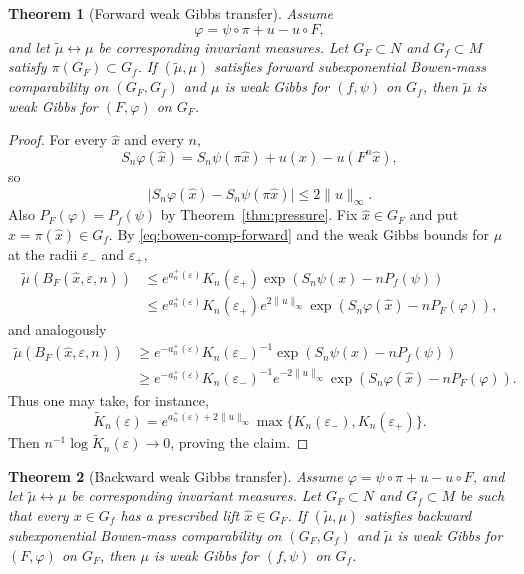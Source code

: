 \documentclass[11pt,a4paper]{article}
\newtheorem{theorem}{Theorem}[section]
\newcommand{\eps}{\varepsilon}
\begin{document}
\begin{theorem}[Forward weak Gibbs transfer]
\label{thm:weak-gibbs-forward}
Assume
\[
\varphi=\psi\circ\pi+u-u\circ F,
\]
and let $\widetilde\mu\leftrightarrow\mu$ be corresponding invariant
measures. Let $G_F\subset N$ and $G_f\subset M$ satisfy
$\pi(G_F)\subset G_f$. If $(\widetilde\mu,\mu)$ satisfies forward
subexponential Bowen-mass comparability on $(G_F,G_f)$ and $\mu$ is weak
Gibbs for $(f,\psi)$ on $G_f$, then $\widetilde\mu$ is weak Gibbs for
$(F,\varphi)$ on $G_F$.
\end{theorem}

\begin{proof}
For every $\hat x$ and every $n$,
\begin{equation}
S_n\varphi(\hat x)
=S_n\psi(\pi\hat x)+u(\hat x)-u(F^n\hat x),
\label{eq:birkhoff-coboundary}
\end{equation}
so
\begin{equation}
\bigl|S_n\varphi(\hat x)-S_n\psi(\pi\hat x)\bigr|
\le2\|u\|_\infty.
\label{eq:birkhoff-bounded-error}
\end{equation}
Also $P_F(\varphi)=P_f(\psi)$ by
Theorem~\ref{thm:pressure}. Fix $\hat x\in G_F$ and put
$x=\pi(\hat x)\in G_f$. By \eqref{eq:bowen-comp-forward} and the weak Gibbs
bounds for $\mu$ at the radii $\eps_-$ and $\eps_+$,
\begin{align*}
\widetilde\mu(B_F(\hat x,\eps,n))
&\le e^{a_n^+(\eps)}K_n(\eps_+)
 \exp(S_n\psi(x)-nP_f(\psi))\\
&\le e^{a_n^+(\eps)}K_n(\eps_+)e^{2\|u\|_\infty}
 \exp(S_n\varphi(\hat x)-nP_F(\varphi)),
\end{align*}
and analogously
\begin{align*}
\widetilde\mu(B_F(\hat x,\eps,n))
&\ge e^{-a_n^+(\eps)}K_n(\eps_-)^{-1}
 \exp(S_n\psi(x)-nP_f(\psi))\\
&\ge e^{-a_n^+(\eps)}K_n(\eps_-)^{-1}e^{-2\|u\|_\infty}
 \exp(S_n\varphi(\hat x)-nP_F(\varphi)).
\end{align*}
Thus one may take, for instance,
\[
\widetilde K_n(\eps)
=e^{a_n^+(\eps)+2\|u\|_\infty}
\max\{K_n(\eps_-),K_n(\eps_+)\}.
\]
Then $n^{-1}\log\widetilde K_n(\eps)\to0$, proving the claim.
\end{proof}

\begin{theorem}[Backward weak Gibbs transfer]
\label{thm:weak-gibbs-backward}
Assume
$\varphi=\psi\circ\pi+u-u\circ F$, and let
$\widetilde\mu\leftrightarrow\mu$ be corresponding invariant measures.
Let $G_F\subset N$ and $G_f\subset M$ be such that every $x\in G_f$ has
a prescribed lift $\hat x\in G_F$. If $(\widetilde\mu,\mu)$ satisfies
backward subexponential Bowen-mass comparability on $(G_F,G_f)$ and
$\widetilde\mu$ is weak Gibbs for $(F,\varphi)$ on $G_F$, then $\mu$ is
weak Gibbs for $(f,\psi)$ on $G_f$.
\end{theorem}
\end{document}

